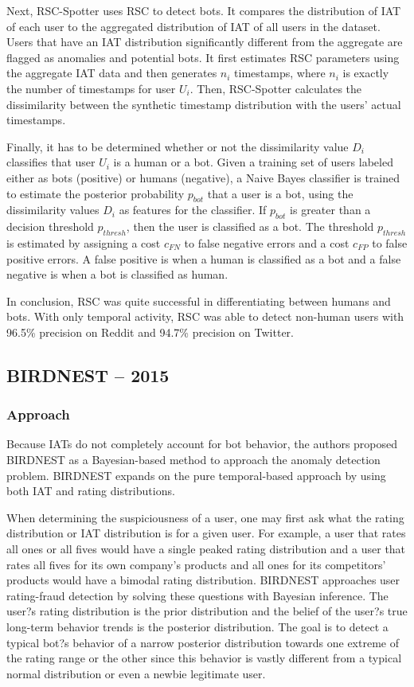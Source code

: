\documentclass[11pt, oneside]{article}   	%
\begin{document}
\quad Next, RSC-Spotter uses RSC to detect bots.
It compares the distribution of IAT of each user to the aggregated distribution of IAT of all users in the dataset.
Users that have an IAT distribution significantly different from the aggregate are flagged as anomalies and potential bots.
It first estimates RSC parameters using the aggregate IAT data and then generates $n_i$ timestamps, where $n_i$ is exactly the number of timestamps for user $U_i$.
Then, RSC-Spotter calculates the dissimilarity between the synthetic timestamp distribution with the users' actual timestamps.

\quad Finally, it has to be determined whether or not the dissimilarity value $D_i$ classifies that user $U_i$ is a human or a bot.
Given a training set of users labeled either as bots (positive) or humans (negative), a Naive Bayes classifier is trained to estimate the posterior probability $p_{bot}$ that a user is a bot, using the dissimilarity values $D_i$ as features for the classifier.
If $p_{bot}$ is greater than a decision threshold $p_{thresh}$, then the user is classified as a bot.
The threshold $p_{thresh}$ is estimated by assigning a cost $c_{FN}$ to false negative errors and a cost $c_{FP}$ to false positive errors.
A false positive is when a human is classified as a bot and a false negative is when a bot is classified as human.

\quad In conclusion, RSC was quite successful in differentiating between humans and bots.
With only temporal activity, RSC was able to detect non-human users with 96.5\% precision on Reddit and 94.7\% precision on Twitter.

\subsection*{BIRDNEST -- 2015}

\subsubsection*{Approach}

\quad Because IATs do not completely account for bot behavior, the authors proposed BIRDNEST as a Bayesian-based method to approach the anomaly detection problem. 
BIRDNEST expands on the pure temporal-based approach by using both IAT and rating distributions.

\quad When determining the suspiciousness of a user, one may first ask what the rating distribution or IAT distribution is for a given user.
For example, a user that rates all ones or all fives would have a single peaked rating distribution and a user that rates all fives for its own company's products and all ones for its competitors' products would have a bimodal rating distribution.
BIRDNEST approaches user rating-fraud detection by solving these questions with Bayesian inference.
The user?s rating distribution is the prior distribution and the belief of the user?s true long-term behavior trends is the posterior distribution.
The goal is to detect a typical bot?s behavior of a narrow posterior distribution towards one extreme of the rating range or the other since this behavior is vastly different from a typical normal distribution or even a newbie legitimate user.
\end{document}
